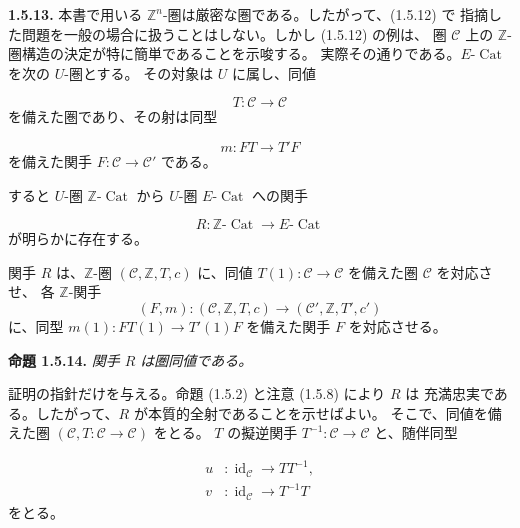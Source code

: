 \clearpage
{}%
\noindent\textbf{1.5.13.}\quad
本書で用いる $\mathbb Z^n$-圏は厳密な圏である。したがって、(1.5.12) で
指摘した問題を一般の場合に扱うことはしない。しかし (1.5.12) の例は、
圏 $\mathcal C$ 上の $\mathbb Z$-圏構造の決定が特に簡単であることを示唆する。
実際その通りである。$E\text{-}\operatorname{Cat}$ を次の $U$-圏とする。
その対象は $U$ に属し、同値

\begin{equation}
  T\colon\mathcal C\longrightarrow\mathcal C
  \tag{1.5.13.1}
\end{equation}
を備えた圏であり、その射は同型

\begin{equation}
  m\colon FT\longrightarrow T'F
  \tag{1.5.13.2}
\end{equation}
を備えた関手 $F\colon\mathcal C\to\mathcal C'$ である。

すると $U$-圏 $\mathbb Z\text{-}\operatorname{Cat}$ から $U$-圏
$E\text{-}\operatorname{Cat}$ への関手

\begin{equation}
  R\colon \mathbb Z\text{-}\operatorname{Cat}
  \longrightarrow E\text{-}\operatorname{Cat}
  \tag{1.5.13.3}
\end{equation}
が明らかに存在する。

関手 $R$ は、$\mathbb Z$-圏 $(\mathcal C,\mathbb Z,T,c)$ に、同値
$T(1)\colon\mathcal C\to\mathcal C$ を備えた圏 $\mathcal C$ を対応させ、
各 $\mathbb Z$-関手
\[
  (F,m)\colon(\mathcal C,\mathbb Z,T,c)
  \longrightarrow(\mathcal C',\mathbb Z,T',c')
\]
に、同型 $m(1)\colon FT(1)\to T'(1)F$ を備えた関手 $F$ を対応させる。

\noindent\textbf{命題 1.5.14.}\quad
\emph{関手 $R$ は圏同値である。}

証明の指針だけを与える。命題 (1.5.2) と注意 (1.5.8) により $R$ は
充満忠実である。したがって、$R$ が本質的全射であることを示せばよい。
そこで、同値を備えた圏
$(\mathcal C,T\colon\mathcal C\to\mathcal C)$ をとる。
$T$ の擬逆関手 $T^{-1}\colon\mathcal C\to\mathcal C$ と、随伴同型

\begin{equation}
  \begin{aligned}
    u&\colon\operatorname{id}_{\mathcal C}\longrightarrow TT^{-1},\\
    v&\colon\operatorname{id}_{\mathcal C}\longrightarrow T^{-1}T
  \end{aligned}
  \tag{1.5.14.1}
\end{equation}
をとる。

